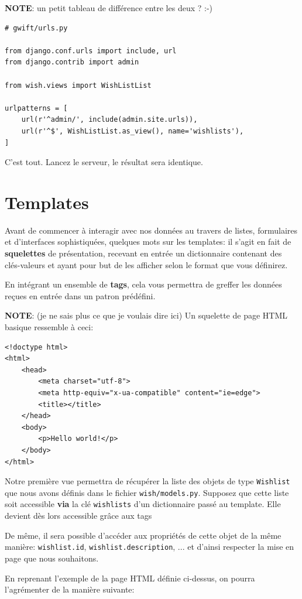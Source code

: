 \documentclass[11pt]{amsbook}
\newcommand{\admonition}[2]{\textbf{#1}: {#2}}
\begin{document}
\admonition{NOTE}{un petit tableau de différence entre les deux ? :-)}
\begin{verbatim}
# gwift/urls.py

from django.conf.urls import include, url
from django.contrib import admin

from wish.views import WishListList

urlpatterns = [
	url(r'^admin/', include(admin.site.urls)),
	url(r'^$', WishListList.as_view(), name='wishlists'),
]
\end{verbatim}

C’est tout. Lancez le serveur, le résultat sera identique.


\hypertarget{x-templates}{\chapter{Templates}}
Avant de commencer à interagir avec nos données au travers de listes, formulaires et d’interfaces sophistiquées, quelques mots sur les templates: il s’agit en fait de \textbf{squelettes} de présentation, recevant en entrée un dictionnaire contenant des clés-valeurs et ayant pour but de les afficher selon le format que vous définirez.


En intégrant un ensemble de \textbf{tags}, cela vous permettra de greffer les données reçues en entrée dans un patron prédéfini.


\admonition{NOTE}{(je ne sais plus ce que je voulais dire ici)}
Un squelette de page HTML basique ressemble à ceci:


\begin{verbatim}
<!doctype html>
<html>
    <head>
        <meta charset="utf-8">
        <meta http-equiv="x-ua-compatible" content="ie=edge">
        <title></title>
    </head>
    <body>
        <p>Hello world!</p>
    </body>
</html>
\end{verbatim}

Notre première vue permettra de récupérer la liste des objets de type \texttt{Wishlist} que nous avons définis dans le fichier \texttt{wish/models.py}. Supposez que cette liste soit accessible \textbf{via} la clé \texttt{wishlists} d’un dictionnaire passé au template. Elle devient dès lors accessible grâce aux tags

De même, il sera possible d’accéder aux propriétés de cette objet de la même manière: \texttt{wishlist.id}, \texttt{wishlist.description}, ... et d’ainsi respecter la mise en page que nous souhaitons.


En reprenant l’exemple de la page HTML définie ci-dessus, on pourra l’agrémenter de la manière suivante:
\end{document}
